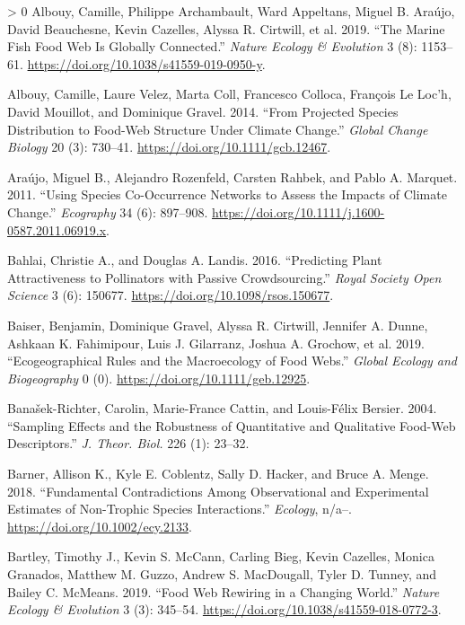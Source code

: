 \documentclass[11pt]{article}
\newlength{\cslhangindent}
\newenvironment{CSLReferences}[3] %
 {%
  \setlength{\parindent}{0pt}
  \ifodd #1 \everypar{\setlength{\hangindent}{\cslhangindent}}\ignorespaces\fi
  \ifnum #2 > 0
  \setlength{\parskip}{#2\baselineskip}
  \fi
 }%
 {}
\begin{document}
\hypertarget{refs}{}
\begin{CSLReferences}{1}{0}
\leavevmode\hypertarget{ref-Albouy2019MarFis}{}%
Albouy, Camille, Philippe Archambault, Ward Appeltans, Miguel B. Araújo,
David Beauchesne, Kevin Cazelles, Alyssa R. Cirtwill, et al. 2019.
{``The Marine Fish Food Web Is Globally Connected.''} \emph{Nature
Ecology \& Evolution} 3 (8): 1153--61.
\url{https://doi.org/10.1038/s41559-019-0950-y}.

\leavevmode\hypertarget{ref-Albouy2014ProSpe}{}%
Albouy, Camille, Laure Velez, Marta Coll, Francesco Colloca, François Le
Loc'h, David Mouillot, and Dominique Gravel. 2014. {``From Projected
Species Distribution to Food-Web Structure Under Climate Change.''}
\emph{Global Change Biology} 20 (3): 730--41.
\url{https://doi.org/10.1111/gcb.12467}.

\leavevmode\hypertarget{ref-Araujo2011UsiSpe}{}%
Araújo, Miguel B., Alejandro Rozenfeld, Carsten Rahbek, and Pablo A.
Marquet. 2011. {``Using Species Co-Occurrence Networks to Assess the
Impacts of Climate Change.''} \emph{Ecography} 34 (6): 897--908.
\url{https://doi.org/10.1111/j.1600-0587.2011.06919.x}.

\leavevmode\hypertarget{ref-Bahlai2016PrePla}{}%
Bahlai, Christie A., and Douglas A. Landis. 2016. {``Predicting Plant
Attractiveness to Pollinators with Passive Crowdsourcing.''} \emph{Royal
Society Open Science} 3 (6): 150677.
\url{https://doi.org/10.1098/rsos.150677}.

\leavevmode\hypertarget{ref-Baiser2019EcoRul}{}%
Baiser, Benjamin, Dominique Gravel, Alyssa R. Cirtwill, Jennifer A.
Dunne, Ashkaan K. Fahimipour, Luis J. Gilarranz, Joshua A. Grochow, et
al. 2019. {``Ecogeographical Rules and the Macroecology of Food Webs.''}
\emph{Global Ecology and Biogeography} 0 (0).
\url{https://doi.org/10.1111/geb.12925}.

\leavevmode\hypertarget{ref-Banasek-Richter2004SamEff}{}%
Banašek-Richter, Carolin, Marie-France Cattin, and Louis-Félix Bersier.
2004. {``Sampling Effects and the Robustness of Quantitative and
Qualitative Food-Web Descriptors.''} \emph{J. Theor. Biol.} 226 (1):
23--32.

\leavevmode\hypertarget{ref-Barner2018FunCon}{}%
Barner, Allison K., Kyle E. Coblentz, Sally D. Hacker, and Bruce A.
Menge. 2018. {``Fundamental Contradictions Among Observational and
Experimental Estimates of Non-Trophic Species Interactions.''}
\emph{Ecology}, n/a--. \url{https://doi.org/10.1002/ecy.2133}.

\leavevmode\hypertarget{ref-Bartley2019FooWeb}{}%
Bartley, Timothy J., Kevin S. McCann, Carling Bieg, Kevin Cazelles,
Monica Granados, Matthew M. Guzzo, Andrew S. MacDougall, Tyler D.
Tunney, and Bailey C. McMeans. 2019. {``Food Web Rewiring in a Changing
World.''} \emph{Nature Ecology \& Evolution} 3 (3): 345--54.
\url{https://doi.org/10.1038/s41559-018-0772-3}.


\end{CSLReferences}
\end{document}
